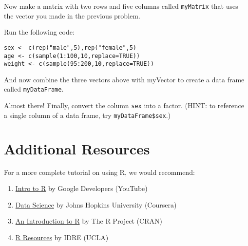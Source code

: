 \prob Now make a matrix with two rows and five columns called \verb|myMatrix| that uses the vector you made in the previous problem.

\prob Run the following code:

\begin{framed}
\begin{Verbatim}[samepage=TRUE]
sex <- c(rep("male",5),rep("female",5)
age <- c(sample(1:100,10,replace=TRUE))
weight <- c(sample(95:200,10,replace=TRUE))
\end{Verbatim}
\end{framed}
And now combine the three vectors above with myVector to create a data frame called \verb|myDataFrame|.

\prob Almost there! Finally, convert the column \verb|sex| into a factor. (HINT: to reference a single column of a data frame, try \verb|myDataFrame$sex|.)

\section{Additional Resources}
For a more complete tutorial on using R, we would recommend:
\begin{enumerate}
	\item \href{https://www.youtube.com/playlist?list=PLOU2XLYxmsIK9qQfztXeybpHvru-TrqAP}{Intro to R} by Google Developers (YouTube)
	\item \href{https://www.coursera.org/specialization/jhudatascience/1/courses}{Data Science} by Johns Hopkins University (Coursera)
	\item \href{http://cran.r-project.org/doc/manuals/R-intro.html}{An Introduction to R} by The R Project (CRAN)
	\item \href{http://statistics.ats.ucla.edu/stat/r/}{R Resources} by IDRE (UCLA)
\end{enumerate}
